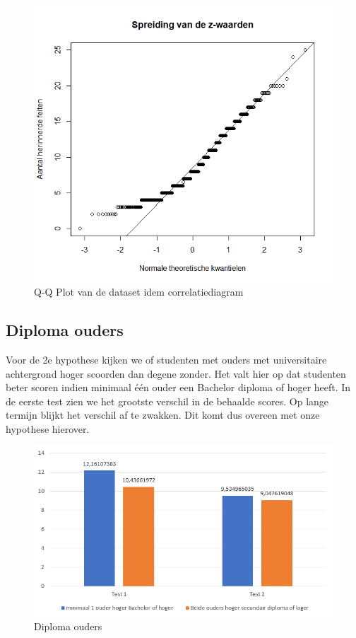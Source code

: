\documentclass{hogent-article}
\begin{document}
	\begin{figure}[H]
		\includegraphics[width=\linewidth]{img/qqplot.png}
		\caption{Q-Q Plot van de dataset idem correlatiediagram}
	\end{figure}

	\subsection{Diploma ouders}
	Voor de 2e hypothese kijken we of studenten met ouders met universitaire achtergrond hoger scoorden dan degene zonder. Het valt hier op dat studenten beter scoren indien minimaal één ouder een Bachelor diploma of hoger heeft. In de eerste test zien we het grootste verschil in de behaalde scores. Op lange termijn blijkt het verschil af te zwakken. Dit komt dus overeen met onze hypothese hierover.
	
	\begin{figure}[H]
		\includegraphics[width=\linewidth]{img/univ.png}
		\caption{Diploma ouders}
	\end{figure}
	
\end{document}
